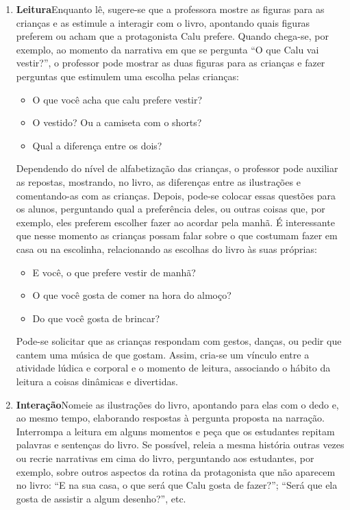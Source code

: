 \documentclass[11pt]{extarticle}
\begin{document}
\begin{enumerate}
\item \textbf{Leitura}\quad Enquanto lê, sugere-se que a professora mostre as figuras para as crianças e as estimule a interagir com o livro, apontando quais figuras preferem ou acham que a protagonista Calu prefere. Quando chega-se, por exemplo, ao momento da narrativa em que se pergunta ``O que Calu vai vestir?'', o professor pode mostrar as duas figuras para as crianças e fazer perguntas que estimulem uma escolha pelas crianças:

\begin{itemize}
\item O que você acha que calu prefere vestir?
\item O vestido? Ou a camiseta com o shorts?
\item Qual a diferença entre os dois?
\end{itemize}

Dependendo do nível de alfabetização das crianças, o professor pode auxiliar as repostas, mostrando, no livro, as diferenças entre as ilustrações e comentando-as com as crianças.
Depois, pode-se colocar essas questões para os alunos, perguntando qual a preferência deles, ou outras coisas que, por exemplo, eles preferem escolher fazer ao acordar pela manhã.
É interessante que nesse momento as crianças possam falar sobre o que costumam fazer em casa ou na escolinha, relacionando as escolhas do livro às suas próprias:

\begin{itemize}
\item E você, o que prefere vestir de manhã?
\item O que você gosta de comer na hora do almoço?
\item Do que você gosta de brincar?
\end{itemize}

Pode-se solicitar que as crianças respondam com gestos, danças, ou pedir que cantem uma música de que gostam. Assim, cria-se um vínculo entre a atividade lúdica e corporal e o momento de leitura, associando o hábito da leitura a coisas dinâmicas e divertidas.



\item \textbf{Interação}\quad Nomeie as ilustrações 
do livro, apontando para elas com o dedo e, ao mesmo tempo, elaborando respostas à pergunta proposta na narração. Interrompa a leitura em alguns momentos e peça que 
os estudantes repitam palavras e sentenças do livro. Se possível, 
releia a mesma história outras vezes ou recrie narrativas em cima do livro, perguntando aos estudantes, por exemplo, sobre outros aspectos da rotina da protagonista que não aparecem no livro: ``E na sua casa, o que será que Calu gosta de fazer?''; ``Será que ela gosta de assistir a algum desenho?'', etc.
\end{enumerate}
\end{document}
